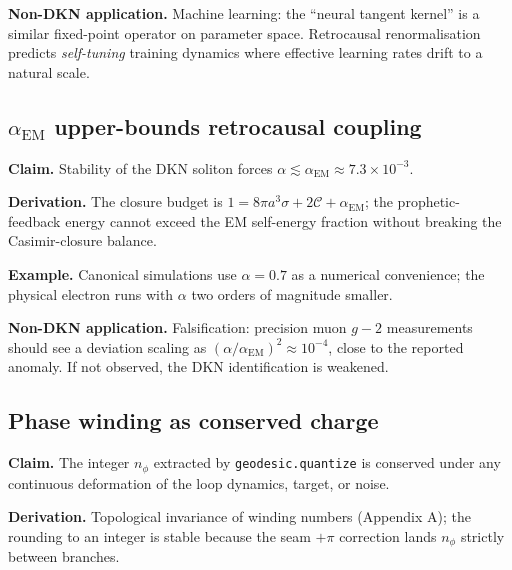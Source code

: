 \documentclass[11pt,a4paper]{article}
\theoremstyle{definition}
\begin{document}
\begin{tcolorbox}[applbox]
\textbf{Non-DKN application.}
Machine learning: the ``neural tangent kernel'' is a similar
fixed-point operator on parameter space. Retrocausal renormalisation
predicts \emph{self-tuning} training dynamics where effective learning
rates drift to a natural scale.
\end{tcolorbox}

\subsection{$\alpha_{\mathrm{EM}}$ upper-bounds retrocausal coupling}\label{nov:13}

\begin{tcolorbox}[noveltybox]
\textbf{Claim.} Stability of the DKN soliton forces
$\alpha \lesssim \alpha_{\mathrm{EM}} \approx 7.3\times 10^{-3}$.
\end{tcolorbox}

\textbf{Derivation.} The closure budget is
$1 = 8\pi a^3\sigma + 2\mathcal{C} + \alpha_{\mathrm{EM}}$; the
prophetic-feedback energy cannot exceed the EM self-energy fraction
without breaking the Casimir-closure balance.

\textbf{Example.} Canonical simulations use $\alpha = 0.7$ as a
numerical convenience; the physical electron runs with $\alpha$ two
orders of magnitude smaller.

\begin{tcolorbox}[applbox]
\textbf{Non-DKN application.}
Falsification: precision muon $g-2$ measurements should see a deviation
scaling as $(\alpha/\alpha_{\mathrm{EM}})^2 \approx 10^{-4}$, close to
the reported anomaly. If not observed, the DKN identification is
weakened.
\end{tcolorbox}

\subsection{Phase winding as conserved charge}\label{nov:14}

\begin{tcolorbox}[noveltybox]
\textbf{Claim.} The integer $n_\phi$ extracted by
\texttt{geodesic.quantize} is conserved under any continuous deformation
of the loop dynamics, target, or noise.
\end{tcolorbox}

\textbf{Derivation.} Topological invariance of winding numbers
(Appendix A); the rounding to an integer is stable because the seam
$+\pi$ correction lands $n_\phi$ strictly between branches.
\end{document}
